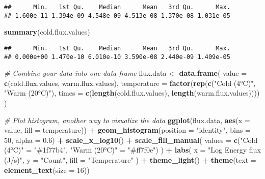 \documentclass[
]{article}
\newenvironment{Shaded}{\begin{snugshade}}{\end{snugshade}}
\newcommand{\AttributeTok}[1]{\textcolor[rgb]{0.13,0.29,0.53}{#1}}
\newcommand{\CommentTok}[1]{\textcolor[rgb]{0.56,0.35,0.01}{\textit{#1}}}
\newcommand{\DecValTok}[1]{\textcolor[rgb]{0.00,0.00,0.81}{#1}}
\newcommand{\FloatTok}[1]{\textcolor[rgb]{0.00,0.00,0.81}{#1}}
\newcommand{\FunctionTok}[1]{\textcolor[rgb]{0.13,0.29,0.53}{\textbf{#1}}}
\newcommand{\NormalTok}[1]{#1}
\newcommand{\OtherTok}[1]{\textcolor[rgb]{0.56,0.35,0.01}{#1}}
\newcommand{\SpecialCharTok}[1]{\textcolor[rgb]{0.81,0.36,0.00}{\textbf{#1}}}
\newcommand{\StringTok}[1]{\textcolor[rgb]{0.31,0.60,0.02}{#1}}
\begin{document}
\begin{verbatim}
##      Min.   1st Qu.    Median      Mean   3rd Qu.      Max. 
## 1.600e-11 1.394e-09 4.548e-09 4.513e-08 1.370e-08 1.031e-05
\end{verbatim}

\begin{Shaded}
\begin{Highlighting}[]
\FunctionTok{summary}\NormalTok{(cold.flux.values)}
\end{Highlighting}
\end{Shaded}

\begin{verbatim}
##      Min.   1st Qu.    Median      Mean   3rd Qu.      Max. 
## 0.000e+00 1.470e-10 6.010e-10 3.590e-08 2.440e-09 1.409e-05
\end{verbatim}

\begin{Shaded}
\begin{Highlighting}[]
\CommentTok{\# Combine your data into one data frame}
\NormalTok{flux.data }\OtherTok{\textless{}{-}} \FunctionTok{data.frame}\NormalTok{(}
  \AttributeTok{value =} \FunctionTok{c}\NormalTok{(cold.flux.values, warm.flux.values),}
  \AttributeTok{temperature =} \FunctionTok{factor}\NormalTok{(}\FunctionTok{rep}\NormalTok{(}\FunctionTok{c}\NormalTok{(}\StringTok{"Cold (4°C)"}\NormalTok{, }\StringTok{"Warm (20°C)"}\NormalTok{), }
                           \AttributeTok{times =} \FunctionTok{c}\NormalTok{(}\FunctionTok{length}\NormalTok{(cold.flux.values), }\FunctionTok{length}\NormalTok{(warm.flux.values))))}
\NormalTok{)}

\CommentTok{\# Plot histogram, another way to visualize the data}
\FunctionTok{ggplot}\NormalTok{(flux.data, }\FunctionTok{aes}\NormalTok{(}\AttributeTok{x =}\NormalTok{ value, }\AttributeTok{fill =}\NormalTok{ temperature)) }\SpecialCharTok{+}
  \FunctionTok{geom\_histogram}\NormalTok{(}\AttributeTok{position =} \StringTok{"identity"}\NormalTok{, }\AttributeTok{bins =} \DecValTok{50}\NormalTok{, }\AttributeTok{alpha =} \FloatTok{0.6}\NormalTok{) }\SpecialCharTok{+}
  \FunctionTok{scale\_x\_log10}\NormalTok{() }\SpecialCharTok{+} 
  \FunctionTok{scale\_fill\_manual}\NormalTok{(}
    \AttributeTok{values =} \FunctionTok{c}\NormalTok{(}\StringTok{"Cold (4°C)"} \OtherTok{=} \StringTok{"\#1f77b4"}\NormalTok{,  }
               \StringTok{"Warm (20°C)"} \OtherTok{=} \StringTok{"\#ff7f0e"}\NormalTok{)}
\NormalTok{  ) }\SpecialCharTok{+}
  \FunctionTok{labs}\NormalTok{(}
    \AttributeTok{x =} \StringTok{"Log Energy flux (J/s)"}\NormalTok{,}
    \AttributeTok{y =} \StringTok{"Count"}\NormalTok{,}
    \AttributeTok{fill =} \StringTok{"Temperature"}
\NormalTok{  ) }\SpecialCharTok{+}
  \FunctionTok{theme\_light}\NormalTok{() }\SpecialCharTok{+}
  \FunctionTok{theme}\NormalTok{(}\AttributeTok{text =} \FunctionTok{element\_text}\NormalTok{(}\AttributeTok{size =} \DecValTok{16}\NormalTok{))}
\end{Highlighting}
\end{Shaded}
\end{document}

